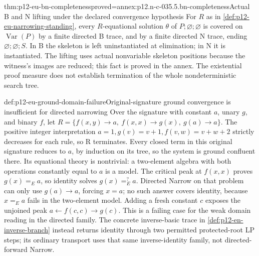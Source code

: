 

\begin{hbtheorem}{thm:p12-eu-bn-completeness}{proved=annex:p12.n-c-035.5.bn-completeness}{Actual B and N lifting under the declared convergence hypothesis}
For \(R\) as in \cref{def:p12-eu-narrowing-standing}, every
\(R\)-equational solution \(\theta\) of \(P;\varnothing;\varnothing\)
is covered on \(\operatorname{Var}(P)\) by a finite directed B
trace, and by a finite directed N trace, ending
\(\varnothing;\varnothing;S\). In B the skeleton is left
uninstantiated at elimination; in N it is instantiated. The lifting
uses actual nonvariable skeleton positions because the witness's
images are reduced; this fact is proved in the annex.
The existential proof measure does not establish termination of the
whole nondeterministic search tree.
\end{hbtheorem}

\begin{hbexample}{def:p12-eu-ground-domain-failure}{Original-signature ground convergence is insufficient for directed narrowing}
Over the signature with constant \(a\), unary \(g\), and binary
\(f\), let
\(R=\{f(x,y)\to a,\ f(x,x)\to g(x),\ g(a)\to a\}\).
The positive integer interpretation
\(a=1,g(v)=v+1,f(v,w)=v+w+2\) strictly decreases for each rule,
so R terminates. Every closed term in this original signature reduces
to \(a\), by induction on its tree, so the system is ground
confluent there. Its equational theory is nontrivial: a two-element
algebra with both operations constantly equal to \(a\) is a model.
The critical peak at \(f(x,x)\) proves \(g(x)=_E a\), so identity
solves \(g(x)=^{?}_E a\).
Directed Narrow on that problem can only use \(g(a)\to a\),
forcing \(x=a\); no such answer covers identity, because
\(x=_E a\) fails in the two-element model. Adding a fresh constant
\(c\) exposes the unjoined peak \(a\leftarrow f(c,c)\to g(c)\).
This is a failing case for the weak domain reading in the directed
family. The concrete inverse-basic trace in
\cref{def:p12-en-inverse-branch} instead returns identity through
two permitted protected-root LP steps; its ordinary transport uses
that same inverse-identity family, not directed-forward Narrow.
\end{hbexample}

